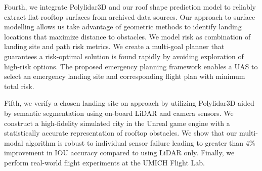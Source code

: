 Fourth, we integrate Polylidar3D and our roof shape prediction model to reliably extract flat rooftop surfaces from archived data sources. Our approach to surface modelling allows us take advantage of geometric methods to identify landing locations that maximize distance to obstacles. We model risk as combination of landing site and path risk metrics.  We create a multi-goal planner that guarantees a risk-optimal solution is found rapidly by avoiding exploration of high-risk options. The proposed emergency planning framework enables a UAS to select an emergency landing site and corresponding flight plan with minimum total risk.

Fifth, we verify a chosen landing site on approach by utilizing Polylidar3D aided by semantic segmentation using on-board LiDAR and camera sensors.  We construct a high-fidelity simulated city in the Unreal game engine with a statistically accurate representation of rooftop obstacles. We show that our multi-modal algorithm is robust to individual sensor failure leading to greater than 4\% improvement in IOU accuracy compared to using LiDAR only. Finally, we perform real-world flight experiments at the UMICH Flight Lab.


